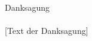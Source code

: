 
\thispagestyle{empty}       %
\vspace*{2.2cm}
\noindent %
{\Huge Danksagung}\\
\vspace*{1.6cm} \\

[Text der Danksagung]
